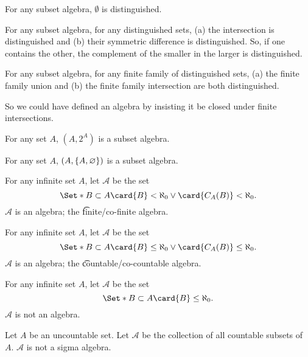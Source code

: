 \begin{prop}
  For any subset algebra, $\emptyset$ is distinguished.
\end{prop}

\begin{prop}
  For any subset algebra,
  for any distinguished sets,
  (a) the intersection is distinguished and
  (b) their symmetric difference is distinguished.
  So, if one contains the other, the complement
  of the smaller in the larger is distinguished.
\end{prop}

\begin{prop}
  For any subset algebra,
  for any finite family of distinguished sets,
  (a) the finite family union and
  (b) the finite family intersection
  are both distinguished.
\end{prop}

So we could have defined an algebra
by insisting it be closed under finite
intersections.


\begin{expl}
  For any set $A$, $(A, 2^{A})$ is a subset algebra.
\end{expl}

\begin{expl}
  For any set $A$, $(A, \{A, \varnothing\})$ is a subset algebra.
\end{expl}

\begin{expl}
  For any infinite set $A$,
  let $\mathcal{A}$ be the set
  $$
  \Set*{
    B \subset A
  }{
    \card{B} < \aleph_0 \lor
    \card{C_{A}(B)} < \aleph_0
  }.
  $$
  $\mathcal{A}$ is an algebra;
  the
  \t{finite/co-finite algebra}.
\end{expl}

\begin{expl}
  For any infinite set $A$,
  let $\mathcal{A}$ be the set
  $$
  \Set*{
    B \subset A
  }{
    \card{B} \leq \aleph_0 \lor
    \card{C_{A}(B)} \leq \aleph_0
  }.
  $$
  $\mathcal{A}$ is an algebra;
  the
  \t{countable/co-countable algebra}.
\end{expl}


\begin{expl}
  For any infinite set $A$,
  let $\mathcal{A}$ be the set
  $$
  \Set*{
    B \subset A
  }{
    \card{B} \leq \aleph_0
  }.
  $$
  $\mathcal{A}$ is not an algebra.
\end{expl}

\begin{expl}
  Let $A$ be an uncountable set.
  Let $\mathcal{A}$ be the collection
  of all countable subsets of $A$.
  $\mathcal{A}$ is not a sigma algebra.
\end{expl}
\strats
